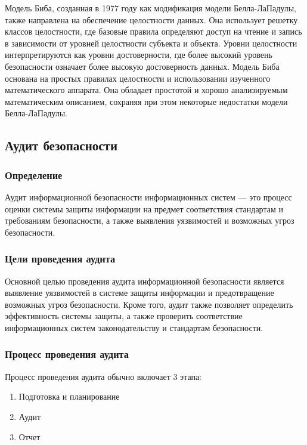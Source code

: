 Модель Биба, созданная в 1977 году как модификация модели Белла-ЛаПадулы, также направлена на обеспечение целостности данных. Она использует решетку классов целостности, где базовые правила определяют доступ на чтение и запись в зависимости от уровней целостности субъекта и объекта. Уровни целостности интерпретируются как уровни достоверности, где более высокий уровень безопасности означает более высокую достоверность данных. Модель Биба основана на простых правилах целостности и использовании изученного математического аппарата. Она обладает простотой и хорошо анализируемым математическим описанием, сохраняя при этом некоторые недостатки модели Белла-ЛаПадулы.

\subsection{Аудит безопасности}

\subsubsection{Определение}

Аудит информационной безопасности информационных систем — это процесс оценки системы защиты информации на предмет соответствия стандартам и требованиям безопасности, а также выявления уязвимостей и возможных угроз безопасности.

\subsubsection{Цели проведения аудита}

Основной целью проведения аудита информационной безопасности является выявление уязвимостей в системе защиты информации и предотвращение возможных угроз безопасности. Кроме того, аудит также позволяет определить эффективность системы защиты, а также проверить соответствие информационных систем законодательству и стандартам безопасности.

\subsubsection{Процесс проведения аудита}

Процесс проведения аудита обычно включает 3 этапа:
\begin{enumerate}
	\item Подготовка и планирование
	\item Аудит
	\item Отчет
\end{enumerate}

